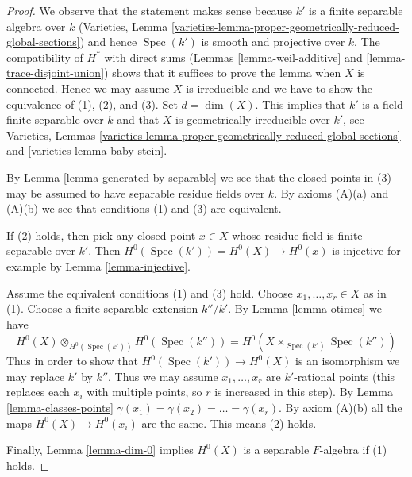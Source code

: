 \documentclass[10pt,a4paper]{amsart}
\theoremstyle{plain}
\theoremstyle{definition}
\theoremstyle{remark}
\numberwithin{equation}{subsection}
\def\Spec{\mathop{\mathrm{Spec}}}
\begin{document}
\begin{proof}
We observe that the statement makes sense because $k'$ is a finite separable
algebra over $k$ (Varieties, Lemma
\ref{varieties-lemma-proper-geometrically-reduced-global-sections})
and hence $\Spec(k')$ is smooth and projective over $k$.
The compatibility of $H^*$ with direct sums
(Lemmas \ref{lemma-weil-additive} and \ref{lemma-trace-disjoint-union})
shows that it suffices to prove the lemma when $X$ is connected.
Hence we may assume $X$ is irreducible and we have to show the
equivalence of (1), (2), and (3). Set $d = \dim(X)$.
This implies that $k'$ is a field finite separable
over $k$ and that $X$ is geometrically irreducible over $k'$, see
Varieties, Lemmas
\ref{varieties-lemma-proper-geometrically-reduced-global-sections} and
\ref{varieties-lemma-baby-stein}.

\medskip\noindent
By Lemma \ref{lemma-generated-by-separable} we see that the closed
points in (3) may be assumed to have separable residue fields over $k$.
By axioms (A)(a) and (A)(b) we see that conditions (1) and (3) are equivalent.

\medskip\noindent
If (2) holds, then pick any closed point $x \in X$ whose residue field
is finite separable over $k'$. Then
$H^0(\Spec(k')) = H^0(X) \to H^0(x)$ is injective for example by
Lemma \ref{lemma-injective}.

\medskip\noindent
Assume the equivalent conditions (1) and (3) hold. Choose
$x_1, \ldots, x_r \in X$ as in (1). Choose a finite separable
extension $k''/k'$. By Lemma \ref{lemma-otimes} we have
$$
H^0(X) \otimes_{H^0(\Spec(k'))} H^0(\Spec(k'')) =
H^0(X \times_{\Spec(k')} \Spec(k''))
$$
Thus in order to show that
$H^0(\Spec(k')) \to H^0(X)$ is an isomorphism
we may replace $k'$ by $k''$. Thus we may assume $x_1, \ldots, x_r$
are $k'$-rational points (this replaces each $x_i$ with multiple
points, so $r$ is increased in this step). By Lemma \ref{lemma-classes-points}
$\gamma(x_1) = \gamma(x_2) = \ldots = \gamma(x_r)$.
By axiom (A)(b) all the maps $H^0(X) \to H^0(x_i)$
are the same. This means (2) holds.

\medskip\noindent
Finally, Lemma \ref{lemma-dim-0} implies
$H^0(X)$ is a separable $F$-algebra if (1) holds.
\end{proof}
\end{document}
